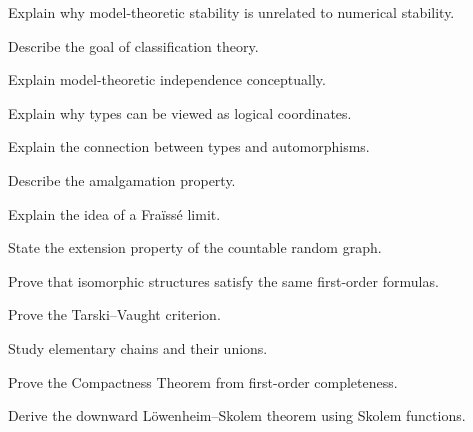 \begin{exercise}[3]
Explain why model-theoretic stability is unrelated to numerical stability.
\end{exercise}

\begin{exercise}[3]
Describe the goal of classification theory.
\end{exercise}

\begin{exercise}[3]
Explain model-theoretic independence conceptually.
\end{exercise}

\begin{exercise}[3]
Explain why types can be viewed as logical coordinates.
\end{exercise}

\begin{exercise}[3]
Explain the connection between types and automorphisms.
\end{exercise}

\begin{exercise}[3]
Describe the amalgamation property.
\end{exercise}

\begin{exercise}[3]
Explain the idea of a Fraïssé limit.
\end{exercise}

\begin{exercise}[3]
State the extension property of the countable random graph.
\end{exercise}

\begin{exercise}[4]
Prove that isomorphic structures satisfy the same first-order formulas.
\end{exercise}

\begin{exercise}[4]
Prove the Tarski--Vaught criterion.
\end{exercise}

\begin{exercise}[4]
Study elementary chains and their unions.
\end{exercise}

\begin{exercise}[4]
Prove the Compactness Theorem from first-order completeness.
\end{exercise}

\begin{exercise}[4]
Derive the downward Löwenheim--Skolem theorem using Skolem functions.
\end{exercise}

